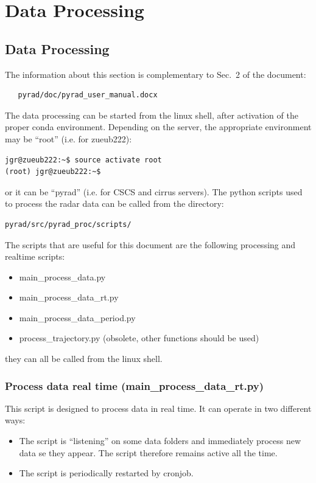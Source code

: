 \documentclass[a4paper,11pt,pdftex,twoside]{scrartcl}
\begin{document}
\section{Data Processing}

\subsection{Data Processing}
The information about this section is complementary to Sec.~2 of the document:

\begin{verbatim}
   pyrad/doc/pyrad_user_manual.docx
\end{verbatim}


The data processing can be started from the linux shell, after activation of the proper conda environment. Depending on the server, the appropriate environment may be  ``root'' (i.e. for zueub222):

\begin{verbatim}
jgr@zueub222:~$ source activate root
(root) jgr@zueub222:~$ 
\end{verbatim}

\noindent
or it can be ``pyrad'' (i.e. for CSCS and cirrus servers).
The python scripts used to process the radar data can be called from the directory:

\begin{verbatim}
pyrad/src/pyrad_proc/scripts/
\end{verbatim}

\noindent
The scripts that are useful for this document are the following processing and realtime scripts:
\begin{itemize}
   \item main\_process\_data.py
   \item main\_process\_data\_rt.py
   \item main\_process\_data\_period.py
   \item process\_trajectory.py (obsolete, other functions should be used)
\end{itemize}
they can all be called from the linux shell.

\subsubsection{Process data real time (main\_process\_data\_rt.py)}
This script is designed to process data in real time. It can operate in two different ways:
\begin{itemize}
\item The script is ``listening'' on some data folders and immediately process new data se they appear. The script therefore remains active all the time.
\item The script is periodically restarted by cronjob.
\end{itemize}
\end{document}
